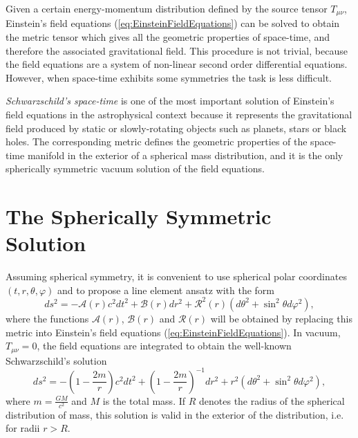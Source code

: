 Given a certain energy-momentum distribution defined by the source tensor $T_{\mu \nu}$,  Einstein's field equations (\ref{eq:EinsteinFieldEquations}) can be solved to obtain the metric tensor which gives all the geometric properties of space-time, and therefore the associated gravitational field. This procedure is not trivial, because the field equations are a system of non-linear second order differential equations. However, when space-time exhibits some symmetries the task is less difficult. 

\textit{Schwarzschild's space-time} is one of the most important solution of Einstein's field equations in the astrophysical context because it represents the gravitational field produced by static or slowly-rotating objects such as planets, stars or black holes. The corresponding metric defines the geometric properties of the space-time manifold in the exterior of a spherical mass distribution, and it is the only spherically symmetric vacuum solution of the field equations.

\section{The Spherically Symmetric Solution}
Assuming spherical symmetry, it is convenient to use spherical polar coordinates $(t,r,\theta,\varphi)$ and to propose a  line element ansatz with the form
\begin{equation}
 ds^2 = - \mathcal{A}(r) c^2 dt^2 + \mathcal{B}(r) dr^2 + \mathcal{R}^2(r) \left( d\theta ^2 + \sin^2 \theta d\varphi ^2 \right),
 \end{equation} 
where the functions $\mathcal{A}(r)$, $\mathcal{B}(r)$ and $\mathcal{R}(r)$ will be obtained by replacing this metric into Einstein's field equations (\ref{eq:EinsteinFieldEquations}). In vacuum, $T_{\mu \nu} = 0$, the field equations are integrated to obtain the well-known Schwarzschild's solution
\begin{equation}
 ds^2 = - \left( 1- \frac{2m}{r} \right) c^2 dt^2 + \left( 1- \frac{2m}{r} \right)^{-1}  dr^2 + r^2 \left( d\theta ^2 + \sin^2 \theta d\varphi ^2 \right),\label{eq:SchwarzschildMetric}
\end{equation}
where $m = \frac{GM}{c^2}$ and $M$ is the total mass. If $R$ denotes the radius of the spherical distribution of mass, this solution is valid in the exterior of the distribution, i.e. for radii $r>R$.

